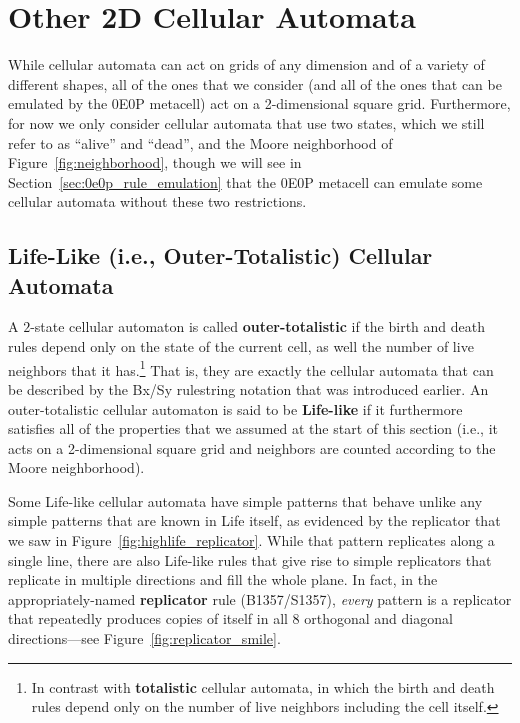 \section{Other 2D Cellular Automata}\label{sec:other_ca_rules}

While cellular automata can act on grids of any dimension and of a variety of different shapes, all of the ones that we consider (and all of the ones that can be emulated by the 0E0P metacell) act on a 2-dimensional square grid. Furthermore, for now we only consider cellular automata that use two states, which we still refer to as ``alive'' and ``dead'', and the Moore neighborhood of Figure~\ref{fig:neighborhood}, though we will see in Section~\ref{sec:0e0p_rule_emulation} that the 0E0P metacell can emulate some cellular automata without these two restrictions.


\subsection{Life-Like (i.e., Outer-Totalistic) Cellular Automata}\label{sec:lifelike_rules}

A $2$-state cellular automaton is called \textbf{outer-totalistic} if the birth and death rules depend only on the state of the current cell, as well the number of live neighbors that it has.\footnote{In contrast with \textbf{totalistic} cellular automata, in which the birth and death rules depend only on the number of live neighbors including the cell itself.} That is, they are exactly the cellular automata that can be described by the Bx/Sy rulestring notation that was introduced earlier. An outer-totalistic cellular automaton is said to be \textbf{Life-like} if it furthermore satisfies all of the properties that we assumed at the start of this section (i.e., it acts on a 2-dimensional square grid and neighbors are counted according to the Moore neighborhood).

Some Life-like cellular automata have simple patterns that behave unlike any simple patterns that are known in Life itself, as evidenced by the replicator that we saw in Figure~\ref{fig:highlife_replicator}. While that pattern replicates along a single line, there are also Life-like rules that give rise to simple replicators that replicate in multiple directions and fill the whole plane. In fact, in the appropriately-named \textbf{replicator} rule (B1357/S1357), \emph{every} pattern is a replicator that repeatedly produces copies of itself in all $8$ orthogonal and diagonal directions---see Figure~\ref{fig:replicator_smile}.


